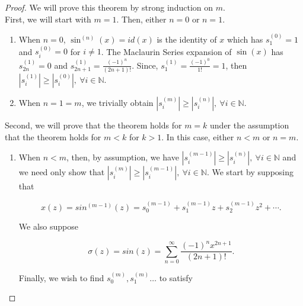 \documentclass{article}
\begin{document}
    \begin{proof}
        We will prove this theorem by strong induction on $m$.\\
        
        First, we will start with $m = 1$. Then, either $n = 0$ or $n = 1$.
        
        \begin{enumerate}
            \item When $n = 0$, $\sin^{(n)}(x) = id(x)$ is the identity of $x$ which has $s_1^{(0)} = 1$ and $s_i^{(0)} = 0$ for $i \neq 1$. The Maclaurin Series expansion of $\sin(x)$ has $s_{2n}^{(1)} = 0$ and $s_{2n+1}^{(1)} = \frac{(-1)^n}{(2n+1)!}$. Since, $s_{1}^{(1)} = \frac{(-1)^0}{1!} = 1$, then $\left|s_{i}^{(1)}\right| \geq \left|s_{i}^{(0)}\right|,\ \forall i \in \mathbb{N}$. 
            
            \item When $n = 1 = m$, we trivially obtain $\left|s_{i}^{(m)}\right| \geq \left|s_{i}^{(n)}\right|,\ \forall i \in \mathbb{N}$.
        \end{enumerate}
        
        Second, we will prove that the theorem holds for $m = k$ under the assumption that the theorem holds for $m < k$ for $k > 1$. In this case, either $n < m$ or $n = m$.
        
        \begin{enumerate}
            \item When $n < m$, then, by assumption, we have $\left|s_{i}^{(m-1)}\right| \geq \left|s_{i}^{(n)}\right|,\ \forall i \in \mathbb{N}$ and we need only show that $\left|s_{i}^{(m)}\right| \geq \left|s_{i}^{(m-1)}\right|,\ \forall i \in \mathbb{N}$. We start by supposing that
            
            \begin{equation}
                x(z) = sin^{(m-1)}(z) = s_0^{(m-1)} + s_1^{(m-1)} z + s_2^{(m-1)} z^2 + \cdots.
            \end{equation}
            
            We also suppose
            
            \begin{equation}
                \sigma(z) = sin(z) = \sum_{n=0}^{\infty} \frac{(-1)^n x^{2n+1}}{(2n+1)!}.
            \end{equation}
            
            Finally, we wish to find $s_0^{(m)}, s_1^{(m)} \ldots$ to satisfy


\end{enumerate}
\end{proof}
\end{document}
